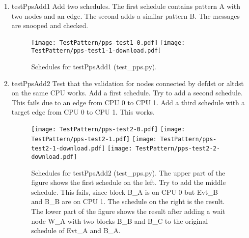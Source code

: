\documentclass[12pt,a4paper]{report}
\begin{document}
\begin{enumerate}
\item testPpsAdd1
    Add two schedules. The first schedule contains pattern A with two nodes and an edge.
    The second adds a similar pattern B.
    The messages are snooped and checked.
    \begin{figure}
        \centering
        \texttt{[image: TestPattern/pps-test1-0.pdf]}
        \texttt{[image: TestPattern/pps-test1-1-download.pdf]}
        \caption{Schedules for testPpsAdd1 (test\_pps.py).}
        \label{fig:Schedules_for_testPpsAdd1-0}
    \end{figure}

\item testPpsAdd2
    Test that the validation for nodes connected by defdst or altdst on
    the same CPU works. Add a first schedule. Try to add a second schedule.
    This fails due to an edge from CPU 0 to CPU 1.
    Add a third schedule with a target edge from CPU 0 to CPU 1. This works.
    \begin{figure}
        \centering
        \texttt{[image: TestPattern/pps-test2-0.pdf]}
        \texttt{[image: TestPattern/pps-test2-1.pdf]}
        \texttt{[image: TestPattern/pps-test2-1-download.pdf]}
        \texttt{[image: TestPattern/pps-test2-2-download.pdf]}
        \caption{Schedules for testPpsAdd2 (test\_pps.py). The upper part of the figure shows
        the first schedule on the left. Try to add the middle schedule. This fails, since block B\_A is on CPU 0
        but Evt\_B and B\_B are on CPU 1. The schedule on the right is the result. The lower part of the figure
        shows the result after adding a wait node W\_A with two blocks B\_B and B\_C to the original
        schedule of Evt\_A and B\_A.}
        \label{fig:Schedules_for_testPpsAdd2-0}
    \end{figure}


\end{enumerate}
\end{document}
